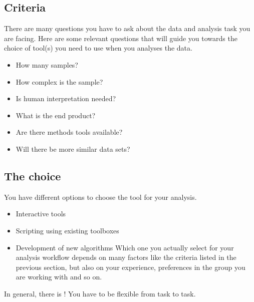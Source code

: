 \documentclass[letterpaper,10pt,english]{sphinxmanual}
\begin{document}
\subsection{Criteria}
\label{\detokenize{01-Introduction:criteria}}
\sphinxAtStartPar
There are many questions you have to ask about the data and analysis task you are facing. Here are some relevant questions that will guide you towards the choice of tool(s) you need to use when you analyses the data.
\begin{itemize}
\item {} 
\sphinxAtStartPar
How many samples?

\item {} 
\sphinxAtStartPar
How complex is the sample?

\item {} 
\sphinxAtStartPar
Is human interpretation needed?

\item {} 
\sphinxAtStartPar
What is the end product?

\item {} 
\sphinxAtStartPar
Are there methods tools available?

\item {} 
\sphinxAtStartPar
Will there be more similar data sets?

\end{itemize}


\subsection{The choice}
\label{\detokenize{01-Introduction:the-choice}}
\sphinxAtStartPar
You have different options to choose the tool for your analysis.
\begin{itemize}
\item {} 
\sphinxAtStartPar
Interactive tools

\item {} 
\sphinxAtStartPar
Scripting using existing toolboxes

\item {} 
\sphinxAtStartPar
Development of new algorithms
Which one you actually select for your analysis workflow depends on many factors like the criteria listed in the previous section, but also on your experience, preferences in the group you are working with and so on.

\end{itemize}

\sphinxAtStartPar
In general, there is ! You have to be flexible from task to task.
\end{document}
